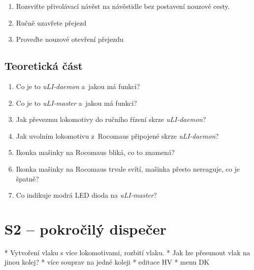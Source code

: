 \documentclass[12pt,a4paper]{article}
\begin{document}
\begin{enumerate}[leftmargin=*]
\item Rozsviťte přivolávací návěst na návěstidle bez postavení nouzové cesty.
\item Ručně uzavřete přejezd
\item Proveďte nouzové otevření přejezdu
\end{enumerate}

\subsection*{Teoretická část}

\begin{enumerate}[leftmargin=*]
\item Co je to \textit{uLI-daemon} a~jakou má funkci?
\item Co je to \textit{uLI-master} a~jakou má funkci?
\item Jak převezmu lokomotivy do ručního řízení skrze \textit{uLI-daemon}?
\item Jak uvolním lokomotivu z~Rocomaus připojené skrze \textit{uLI-daemon}?
\item Ikonka mašinky na Rocomaus bliká, co to znamená?
\item Ikonka mašinky na Rocomaus trvale svítí, mašinka přesto nereaguje, co je
špatně?
\item Co indikuje modrá LED dioda na \textit{uLI-master}?
\end{enumerate}


\newpage
\section{S2 – pokročilý dispečer}

 * Vytvoření vlaku s více lokomotivami, rozbití vlaku.
 * Jak lze přesunout vlak na jinou kolej?
 * více souprav na jedné koleji
 * editace HV
 * menu DK
\end{document}
